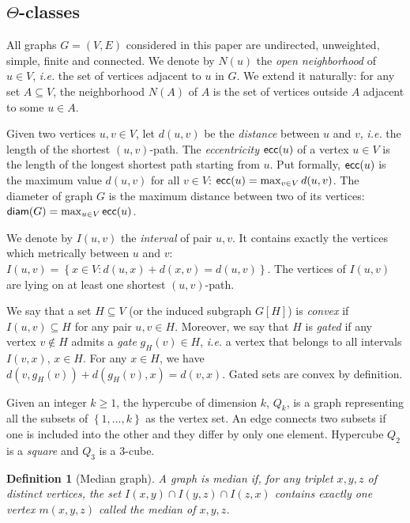 \documentclass{article}
\newtheorem{definition}{Definition}
\newcommand{\set}[1]{\left\{ #1 \right\}}
\newcommand{\diam}{\mbox{\textsf{diam}}}
\newcommand{\ecc}{\mbox{\textsf{ecc}}}
\begin{document}
\subsection{$\Theta$-classes} 

All graphs $G = (V,E)$ considered in this paper are undirected, unweighted, simple, finite and connected. We denote by $N(u)$ the \textit{open neighborhood} of $u \in V$, {\em i.e.} the set of vertices adjacent to $u$ in $G$. We extend it naturally: for any set $A \subseteq V$, the neighborhood $N(A)$ of $A$ is the set of vertices outside $A$ adjacent to some $u \in A$.

Given two vertices $u,v \in V$, let $d(u,v)$ be the \textit{distance} between $u$ and $v$, {\em i.e.} the length of the shortest $(u,v)$-path. The \textit{eccentricity} $\ecc(u)$ of a vertex $u \in V$ is the length of the longest shortest path starting from $u$. Put formally, $\ecc(u)$ is the maximum value $d(u,v)$ for all $v \in V$: $\ecc(u) = \max_{v \in V} d(u,v)$. The diameter of graph $G$ is the maximum distance between two of its vertices: $\diam(G) = \max_{u \in V} \ecc(u)$. 

We denote by $I(u,v)$ the \textit{interval} of pair $u,v$. It contains exactly the vertices which metrically between $u$ and $v$:
$I(u,v) = \set{x \in V: d(u,x) + d(x,v) = d(u,v)}$. The vertices of $I(u,v)$ are lying on at least one shortest $(u,v)$-path.

We say that a set $H\subseteq V$ (or the induced subgraph $G\left[H\right]$) is \textit{convex} if $I(u,v) \subseteq H$ for any pair $u,v \in H$. Moreover, we say that $H$ is \textit{gated} if any vertex $v \notin H$ admits a \textit{gate} $g_H(v) \in H$, {\em i.e.} a vertex that belongs to all intervals $I(v,x)$, $x\in H$. For any $x \in H$, we have $d(v,g_H(v)) + d(g_H(v),x) = d(v,x)$. Gated sets are convex by definition.

Given an integer $k \ge 1$, the hypercube of dimension $k$, $Q_k$, is a graph representing all the subsets of $\set{1,\ldots,k}$ as the vertex set. An edge connects two subsets if one is included into the other and they differ by only one element. Hypercube $Q_2$ is a \textit{square} and $Q_3$ is a $3$-cube.

\begin{definition}[Median graph]
A graph is \textit{median} if, for any triplet $x,y,z$ of distinct vertices, the set $I(x,y) \cap I(y,z) \cap I(z,x)$ contains exactly one vertex $m(x,y,z)$ called the median of $x,y,z$.
\label{def:median}
\end{definition}
\end{document}

